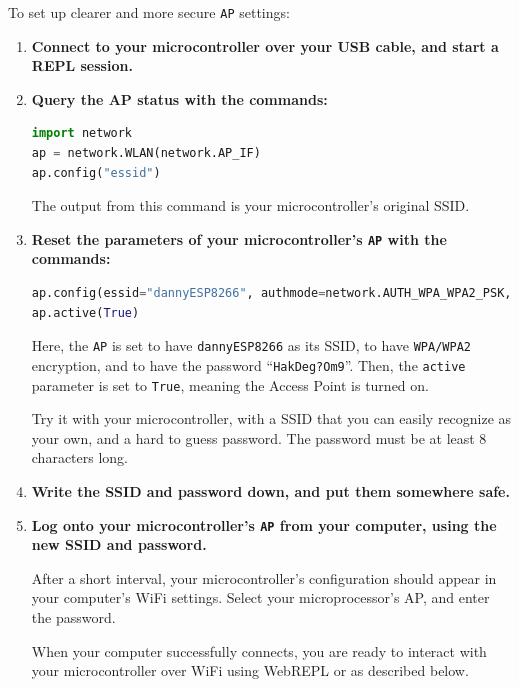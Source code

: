 To set up clearer and more secure \texttt{AP} settings:
\begin{enumerate}
	\item \textbf{Connect to your microcontroller over your USB cable, and start a REPL session.}
	\item \textbf{Query the AP status with the commands:}
\begin{lstlisting}[language=Python]
import network
ap = network.WLAN(network.AP_IF)
ap.config("essid")
\end{lstlisting}
	The output from this command is your microcontroller's original SSID.

	\item \textbf{Reset the parameters of your microcontroller's \texttt{AP} with the commands:}
\begin{lstlisting}[language=Python]
ap.config(essid="dannyESP8266", authmode=network.AUTH_WPA_WPA2_PSK, password="HakDeg?Om9")
ap.active(True)
\end{lstlisting}
	Here, the \texttt{AP} is set to have \verb|dannyESP8266| as its SSID, to have \texttt{WPA/WPA2} encryption, and to have the password ``\verb|HakDeg?Om9|''.
	Then, the \texttt{active} parameter is set to \lstinline|True|, meaning the Access Point is turned on.

	Try it with your microcontroller, with a SSID that you can easily recognize as your own, and a hard to guess password.
	The password must be at least 8 characters long.	


	\item \textbf{Write the SSID and password down, and put them somewhere safe.}

	\item \textbf{Log onto your microcontroller's \texttt{AP} from your computer, using the new SSID and password.}

	After a short interval, your microcontroller's configuration should appear in your computer's WiFi settings.
	Select your microprocessor's AP, and enter the password.

	When your computer successfully connects, you are ready to interact with your microcontroller over WiFi using WebREPL or \mpfshell as described below.
\end{enumerate}

